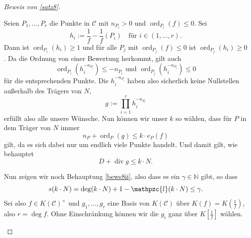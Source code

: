 \documentclass[a4paper,12pt,index=toc]{scrbook}
\theoremstyle{keinenummern} %
\def\CC{\mathcal{C}}
\def\ll{\mathpzc{l}}
\renewcommand{\div}{\operatorname{div}}
\newcommand{\ord}{\operatorname{ord}}
\renewcommand{\dotsc}{\ensuremath{\!...}}
\newcommand{\set}[1]{\ensuremath{\mathbb{#1}}}
\newcommand{\N}{\set{N}}
\begin{document}
\begin{proof}[Beweis von \cref{satz8}]
\begin{enumerate}
Seien $P_{1},\dotsc,P_{r}$ die Punkte in $\CC$ mit $n_{P_{i}}>0$ und $\ord_{P_{i}}(f)\leq 0$. Sei
\begin{equation*}h_{i}:=\frac{1}{f}-\frac{1}{f}(P_{i})\quad\text{für }i\in(1,\dotsc,r).\end{equation*}
Dann ist $\ord_{P_{i}}(h_{i})\geq 1$ und für alle $P_{j}$ mit $\ord_{P_{j}}(f)\leq 0$ ist $\ord_{P_{j}}(h_{i})\geq 0$. Da die Ordnung von einer Bewertung herkommt, gilt auch
\begin{equation*}\ord_{P_{i}}(h_{i}^{-n_{P_{i}}})\leq-n_{P_{i}}\text{ und }\ord_{P_{j}}(h_{i}^{-n_{P_{i}}})\leq 0\end{equation*}
für die entsprechenden Punkte. Die $h_{i}^{-n_{P_{i}}}$ haben also sicherlich keine Nullstellen außerhalb des Trägers von $N$,
\begin{equation*}g:=\prod_{i=1}^{r}h_{i}^{-n_{P_{i}}}\end{equation*}
erfüllt also alle unsere Wünsche. Nun können wir unser $k$ so wählen, dass für $P$ in dem Träger von $N$ immer 
\begin{equation*}n_{P}+\ord_{P}(g)\leq k\cdot e_{P}(f)\end{equation*}
gilt, da es sich dabei nur um endlich viele Punkte handelt. Und damit gilt, wie behauptet
\begin{equation*}D+\div g\leq k\cdot N.\end{equation*}

Nun zeigen wir noch Behauptung \ref{bews8ii}, also dass es ein $\gamma\in\N$ gibt, so dass
\begin{equation*}s(k\cdot N)=\deg(k\cdot N)+1-\ll(k\cdot N)\leq\gamma.\end{equation*}
Sei also $f\in K(\CC)^{\times}$ und $g_{1},\dotsc,g_{r}$ eine Basis von $K(\CC)$ über $K(f)=K(\frac{1}{f})$, also $r=\deg f$. Ohne Einschränkung können wir die $g_{i}$ ganz über $K[\frac{1}{f}]$ wählen.


\end{enumerate}
\end{proof}
\end{document}

